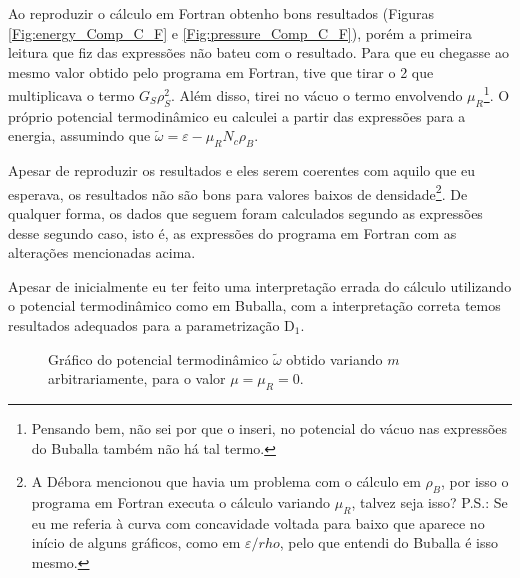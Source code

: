 Ao reproduzir o cálculo em Fortran obtenho bons resultados (Figuras \ref{Fig:energy_Comp_C_F} e \ref{Fig:pressure_Comp_C_F}), porém a primeira leitura que fiz das expressões não bateu com o resultado. Para que eu chegasse ao mesmo valor obtido pelo programa em Fortran, tive que tirar o 2 que multiplicava o termo $G_S \rho_S^2$. Além disso, tirei no vácuo o termo envolvendo $\mu_R$\footnote{Pensando bem, não sei por que o inseri, no potencial do vácuo nas expressões do Buballa também não há tal termo.}. O próprio potencial termodinâmico eu calculei a partir das expressões para a energia, assumindo que $\tilde{\omega} = \varepsilon - \mu_R N_c \rho_B$.
	
Apesar de reproduzir os resultados e eles serem coerentes com aquilo que eu esperava, os resultados não são bons para valores baixos de densidade\footnote{A Débora mencionou que havia um problema com o cálculo em $\rho_B$, por isso o programa em Fortran executa o cálculo variando $\mu_R$, talvez seja isso? P.S.: Se eu me referia à curva com concavidade voltada para baixo que aparece no início de alguns gráficos, como em $\varepsilon/rho$, pelo que entendi do Buballa é isso mesmo.}. De qualquer forma, os dados que seguem foram calculados segundo as expressões desse segundo caso, isto é, as expressões do programa em Fortran com as alterações mencionadas acima. 

Apesar de inicialmente eu ter feito uma interpretação errada do cálculo utilizando o potencial termodinâmico como em Buballa\cite{Buballa1996}, com a interpretação correta temos resultados adequados para a parametrização D$_1$.


\begin{figure}
	
	\caption{Gráfico do potencial termodinâmico $\tilde{\omega}$ obtido variando $m$ arbitrariamente, para o valor $\mu = \mu_R = 0$. \protect}
	\label{Fig:pot_term_analysys_NJL-Buballa_Set_1}
\end{figure}

